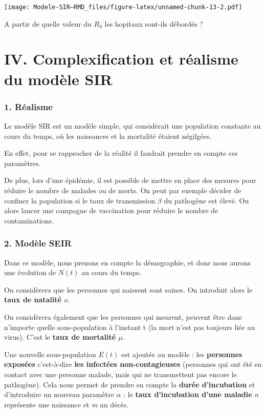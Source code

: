 \documentclass[
]{article}
\begin{document}
\texttt{[image: Modele-SIR---RMD\_files/figure-latex/unnamed-chunk-13-2.pdf]}

A partir de quelle valeur du \(R_0\) les hopitaux sont-ils débordés ?

\hypertarget{iv.-complexification-et-ruxe9alisme-du-moduxe8le-sir}{%
\section{IV. Complexification et réalisme du modèle
SIR}\label{iv.-complexification-et-ruxe9alisme-du-moduxe8le-sir}}

\hypertarget{ruxe9alisme}{%
\subsubsection{1. Réalisme}\label{ruxe9alisme}}

Le modèle SIR est un modèle simple, qui considèrait une population
constante au cours du temps, où les naissances et la mortalité étaient
négilgées.

En effet, pour se rapprocher de la réalité il faudrait prendre en compte
ces paramètres.

De plus, lors d'une épidémie, il est possible de mettre en place des
mesures pour réduire le nombre de malades ou de morts. On peut par
exemple décider de confiner la population si le taux de transmission
\(\beta\) du pathogène est élevé. Ou alors lancer une campagne de
vaccination pour réduire le nombre de contaminations.

\hypertarget{moduxe8le-seir}{%
\subsubsection{2. Modèle SEIR}\label{moduxe8le-seir}}

Dans ce modèle, nous prenons en compte la démographie, et donc nous
aurons une évolution de \(N(t)\) au cours du temps.

On considèrera que les personnes qui naissent sont saines. On introduit
alors le \textbf{taux de natalité \(\nu\)}.

On considèrera également que les personnes qui meurent, peuvent être
dans n'importe quelle sous-population à l'instant t (la mort n'est pas
toujours liée au virus). C'est le \textbf{taux de mortalité \(\mu\)}.

Une nouvelle sous-population \(E(t)\) est ajoutée au modèle : les
\textbf{personnes exposées} c'est-à-dire \textbf{les infectées
non-contagieuses} (personnes qui ont été en contact avec une personne
malade, mais qui ne transmettent pas encore le pathogène). Cela nous
permet de prendre en compte la \textbf{durée d'incubation} et
d'introduire un nouveau paramètre \(\alpha\) : le \textbf{taux
d'incubation d'une maladie} \emph{n} représente une naissance et
\emph{m} un décès.
\end{document}
